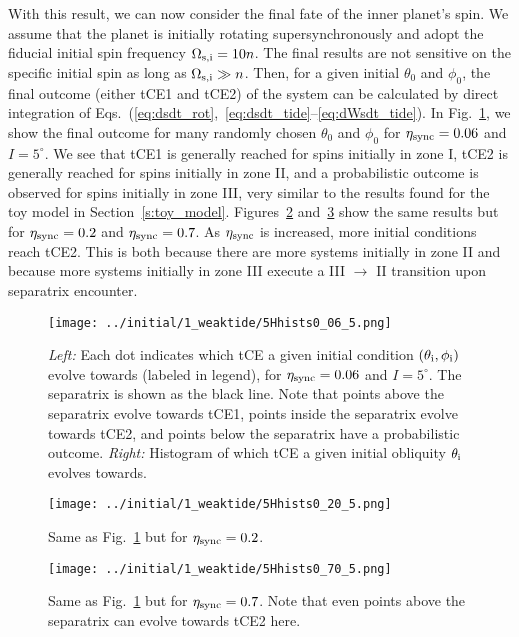 \documentclass[
        fleqn,
        usenatbib,
    ]{mnras}
\begin{document}
With this result, we can now consider the final fate of the inner planet's spin.
We assume that the planet is initially rotating supersynchronously and adopt the
fiducial initial spin frequency $\Omega_{\rm s, i} = 10n$. The final results are
not sensitive on the specific initial spin as long as $\Omega_{\rm s, i} \gg n$.
Then, for a given initial $\theta_0$ and $\phi_0$, the final outcome (either tCE1 and
tCE2) of the system can be calculated by direct integration of
Eqs.~(\ref{eq:dsdt_rot},~\ref{eq:dsdt_tide}--\ref{eq:dWsdt_tide}). In
Fig.~\ref{fig:Hhists_0_06}, we show the final outcome for many randomly chosen
$\theta_0$ and $\phi_0$ for $\eta_{\rm sync} = 0.06$ and $I = 5^\circ$. We see
that tCE1 is generally reached for spins initially in zone I, tCE2 is generally
reached for spins initially in zone II, and a probabilistic outcome is observed
for spins initially in zone III, very similar to the results found for the toy
model in Section~\ref{s:toy_model}. Figures~\ref{fig:Hhists_0_20}
and~\ref{fig:Hhists_0_70} show the same results but for $\eta_{\rm sync} = 0.2$
and $\eta_{\rm sync} = 0.7$. As $\eta_{\rm sync}$ is increased, more initial
conditions reach tCE2. This is both because there are more systems initially in
zone II and because more systems initially in zone III execute a III $\to$ II
transition upon separatrix encounter.
\begin{figure}
    \centering
    \texttt{[image: ../initial/1\_weaktide/5Hhists0\_06\_5.png]}
    \caption{\emph{Left:} Each dot indicates which tCE a given initial condition
    $(\theta_{\rm i}, \phi_{\rm i})$ evolve towards (labeled in legend), for
    $\eta_{\rm sync} = 0.06$ and $I = 5^\circ$. The
    separatrix is shown as the black line. Note that points above the
    separatrix evolve towards tCE1, points inside the separatrix evolve towards
    tCE2, and points below the separatrix have a probabilistic outcome.
    \emph{Right:} Histogram of which tCE a given initial obliquity $\theta_{\rm
    i}$ evolves towards.}\label{fig:Hhists_0_06}
\end{figure}
\begin{figure}
    \centering
    \texttt{[image: ../initial/1\_weaktide/5Hhists0\_20\_5.png]}
    \caption{Same as Fig.~\ref{fig:Hhists_0_06} but for $\eta_{\rm sync} =
    0.2$.}\label{fig:Hhists_0_20}
\end{figure}
\begin{figure}
    \centering
    \texttt{[image: ../initial/1\_weaktide/5Hhists0\_70\_5.png]}
    \caption{Same as Fig.~\ref{fig:Hhists_0_06} but for $\eta_{\rm sync} =
    0.7$. Note that even points above the separatrix can evolve towards tCE2
    here.}\label{fig:Hhists_0_70}
\end{figure}
\end{document}
